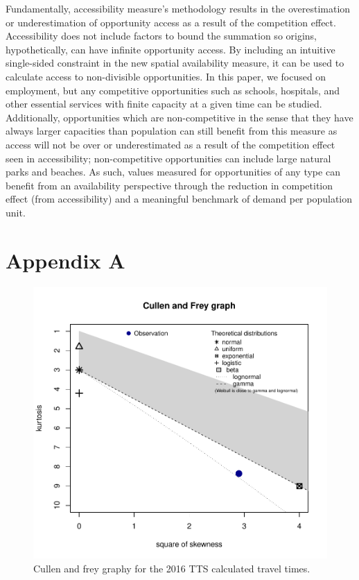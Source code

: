 \documentclass[]{elsarticle} %
\begin{document}
Fundamentally, accessibility measure's methodology results in the
overestimation or underestimation of opportunity access as a result of
the competition effect. Accessibility does not include factors to bound
the summation so origins, hypothetically, can have infinite opportunity
access. By including an intuitive single-sided constraint in the new
spatial availability measure, it can be used to calculate access to
non-divisible opportunities. In this paper, we focused on employment,
but any competitive opportunities such as schools, hospitals, and other
essential services with finite capacity at a given time can be studied.
Additionally, opportunities which are non-competitive in the sense that
they have always larger capacities than population can still benefit
from this measure as access will not be over or underestimated as a
result of the competition effect seen in accessibility; non-competitive
opportunities can include large natural parks and beaches. As such,
values measured for opportunities of any type can benefit from an
availability perspective through the reduction in competition effect
(from accessibility) and a meaningful benchmark of demand per population
unit.

\hypertarget{appendix-a}{%
\section{Appendix A}\label{appendix-a}}

\newpage

\begin{figure}

{\centering \includegraphics[width=1\linewidth]{Spatial-Availability_files/figure-latex/plot-cullen-frey-1} 

}

\caption{\label{fig:plot-cullen-frey}Cullen and frey graphy for the 2016 TTS calculated travel times.}\label{fig:plot-cullen-frey}
\end{figure}
\end{document}
